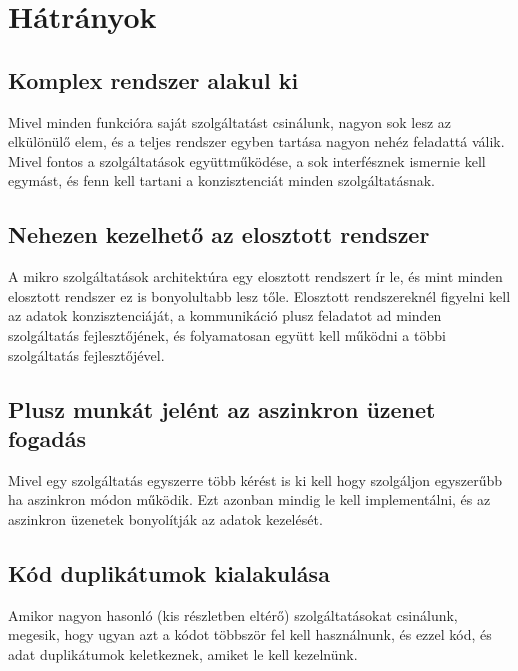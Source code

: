 \documentclass[11pt,magyar,a4paper,oneside,]{report}
\begin{document}
\section{Hátrányok
\citep{micro-disadv}}\label{huxe1truxe1nyok-micro-disadv}

\subsection{Komplex rendszer alakul
ki}\label{komplex-rendszer-alakul-ki}

Mivel minden funkcióra saját szolgáltatást csinálunk, nagyon sok lesz az
elkülönülő elem, és a teljes rendszer egyben tartása nagyon nehéz
feladattá válik. Mivel fontos a szolgáltatások együttműködése, a sok
interfésznek ismernie kell egymást, és fenn kell tartani a
konzisztenciát minden szolgáltatásnak.

\subsection{Nehezen kezelhető az elosztott
rendszer}\label{nehezen-kezelhetux151-az-elosztott-rendszer}

A mikro szolgáltatások architektúra egy elosztott rendszert ír le, és
mint minden elosztott rendszer ez is bonyolultabb lesz tőle. Elosztott
rendszereknél figyelni kell az adatok konzisztenciáját, a kommunikáció
plusz feladatot ad minden szolgáltatás fejlesztőjének, és folyamatosan
együtt kell működni a többi szolgáltatás fejlesztőjével.

\subsection{Plusz munkát jelént az aszinkron üzenet
fogadás}\label{plusz-munkuxe1t-jeluxe9nt-az-aszinkron-uxfczenet-fogaduxe1s}

Mivel egy szolgáltatás egyszerre több kérést is ki kell hogy szolgáljon
egyszerűbb ha aszinkron módon működik. Ezt azonban mindig le kell
implementálni, és az aszinkron üzenetek bonyolítják az adatok kezelését.

\subsection{Kód duplikátumok
kialakulása}\label{kuxf3d-duplikuxe1tumok-kialakuluxe1sa}

Amikor nagyon hasonló (kis részletben eltérő) szolgáltatásokat
csinálunk, megesik, hogy ugyan azt a kódot többször fel kell
használnunk, és ezzel kód, és adat duplikátumok keletkeznek, amiket le
kell kezelnünk.
\end{document}
